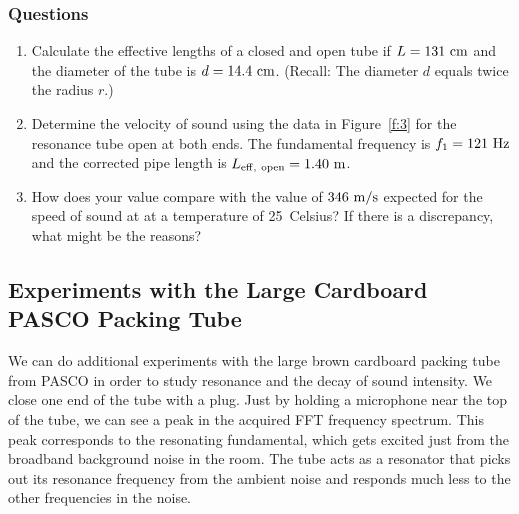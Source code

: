 \documentclass[11pt]{NSF}
\def\ben{\begin{enumerate}}
\def\een{\end{enumerate}}
\def\i{\item{}}
\begin{document}
\subsubsection*{Questions}
\ben
\i Calculate the effective lengths of a closed and open
tube if $L=131~{\rm cm}$ and the diameter of the tube
is $d=14.4~{\rm cm}$.  
(Recall: The diameter  $d$ equals twice the radius $r$.)

\i Determine the velocity of sound using the data in 
Figure~\ref{f:3} for the resonance tube open at both ends.
The fundamental frequency is $f_1 = 121~{\rm Hz}$ and the
corrected pipe length is $L_{\rm eff,\ open}=1.40~{\rm m}$.

\i How does your value compare with the value of 
$346~{\rm m/s}$ expected for the speed of sound at
at a temperature of 25~Celsius?
If there is a discrepancy, what might be the reasons?

\een

\subsection{Experiments with the Large Cardboard PASCO Packing Tube}

We can do additional experiments with the large brown cardboard packing 
tube from PASCO in order to study resonance and the decay of sound intensity. 
We close one end of the tube with a plug. 
Just by holding a microphone near the top of the tube, 
we can see a peak in the acquired FFT frequency spectrum. 
This peak corresponds to the resonating fundamental, which gets excited just from
the broadband background noise in the room. The tube acts as a resonator that
picks out its resonance frequency from the ambient noise and responds much less
to the other frequencies in the noise.
\end{document}
